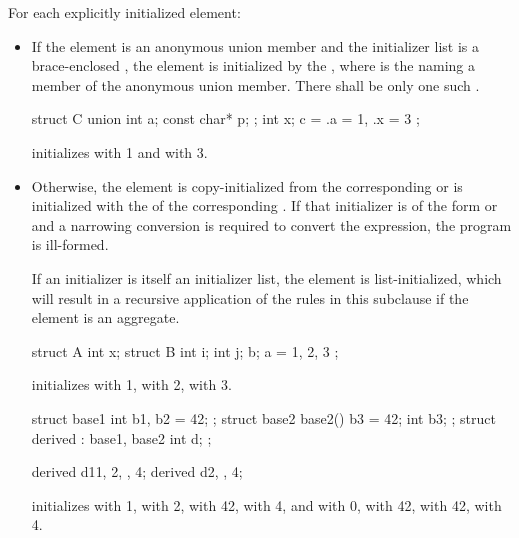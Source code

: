 \pnum
For each explicitly initialized element:
\begin{itemize}
\item
If the element is an anonymous union member and
the initializer list is
a brace-enclosed ,
the element is initialized by the
 \tcode{\{ }\tcode{ \}},
where  is the 
naming a member of the anonymous union member.
There shall be only one such .
\begin{example}
\begin{codeblock}
struct C {
  union {
    int a;
    const char* p;
  };
  int x;
} c = { .a = 1, .x = 3 };
\end{codeblock}
initializes  with 1 and  with 3.
\end{example}
\item
Otherwise, the element is copy-initialized
from the corresponding 
or is initialized with the 
of the corresponding .
If that initializer is of the form
 or
\tcode{= }
and
a narrowing conversion is required
to convert the expression, the program is ill-formed.
\begin{note}
If an initializer is itself an initializer list,
the element is list-initialized, which will result in a recursive application
of the rules in this subclause if the element is an aggregate.
\end{note}
\begin{example}
\begin{codeblock}
struct A {
  int x;
  struct B {
    int i;
    int j;
  } b;
} a = { 1, { 2, 3 } };
\end{codeblock}
initializes
with 1,
with 2,
with 3.

\begin{codeblock}
struct base1 { int b1, b2 = 42; };
struct base2 {
  base2() {
    b3 = 42;
  }
  int b3;
};
struct derived : base1, base2 {
  int d;
};

derived d1{{1, 2}, {}, 4};
derived d2{{}, {}, 4};
\end{codeblock}
initializes
 with 1,
 with 2,
 with 42,
 with 4, and
 with 0,
 with 42,
 with 42,
 with 4.
\end{example}
\end{itemize}

